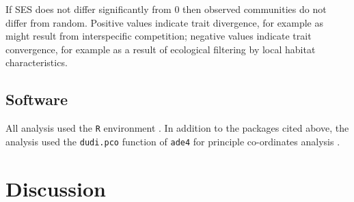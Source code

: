 \documentclass[12pt,a4paper]{book}
\begin{document}
If SES does not differ significantly from $0$ then observed communities do not differ from random. Positive values indicate trait divergence, for example as might result from interspecific competition; negative values indicate trait convergence, for example as a result of ecological filtering by local habitat characteristics.

\subsection{Software}

All analysis used the \texttt{R} environment \citep{R2016}. In addition to the packages cited above, the analysis used the \texttt{dudi.pco} function of \texttt{ade4} for principle co-ordinates analysis \citep{Dray2007}. 



\section{Discussion}



\end{document}
